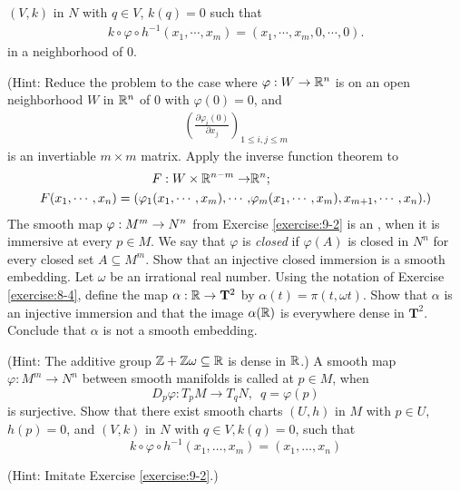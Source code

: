 \begin{enumerate}[label=\theexercise.\arabic*.,ref=\theexercise.\arabic*,leftmargin=2.7em]
    $(V, k)$ in $N$ with $q\in V$, $k(q)=0$ such that
    \begin{align*}
      k\circ\varphi\circ h^{-1}(x_1, \cdots, x_m) = (x_1, \cdots, x_m, 0, \cdots, 0).
    \end{align*}
    in a neighborhood of 0.\par
    \par(Hint: Reduce the problem to the case where $\varphi:W\to{\ensuremath{\mathbb{R}}}^n$ is on an open neighborhood $W$ in ${\mathbb{R}}^n$
    of 0 with $\varphi(0) = 0$, and
    \begin{align*}
      \left(\frac{\partial \varphi_i(0)}{\partial x_j}\right)_{1\le i,j\le m}
    \end{align*}
    is an invertiable $m\times m$ matrix. Apply the inverse function theorem to
    \begin{align*}
      F:W\times {\ensuremath{\mathbb{R}}}^{n-m}\to & {\mathbb{R}}^n;                       \\
      F(x_1, \cdots, x_n)
      = (
      \varphi_1(x_1, \cdots, x_m),
      \cdots,
                            & \varphi_m(x_1, \cdots, x_m),
      x_{m+1},
      \cdots,
      x_n
      ).)
    \end{align*}
  \NewItem The smooth map $\varphi: {M}^{m} \rightarrow  {N}^{n}$ from Exercise \ref{exercise:9-2} is an , when it is immersive at every $p \in  M$. We say that $\varphi$ is \textit{closed} if $\varphi ( A)$ is closed in ${N}^{n}$ for every closed set $A \subseteq  {M}^{m}$. Show that an injective closed immersion is a smooth embedding.
  \NewItem Let $\omega$ be an irrational real number. Using the notation of Exercise \ref{exercise:8-4}, define the map $\alpha  : \mathbb{R} \rightarrow  {\mathbf{T}}^{2}$ by $\alpha ( t)  = \pi ( {t,{\omega t}})$. Show that $\alpha$ is an injective immersion and that the image $\alpha ( \mathbb{R})$ is everywhere dense in ${\mathbf{T}}^{2}$. Conclude that $\alpha$ is not a smooth embedding.
    \par(Hint: The additive group $\mathbb{Z} + \mathbb{Z}\omega  \subseteq  \mathbb{R}$ is dense in $\mathbb{R}$.)
  \NewItem A smooth map $\varphi:M^m\to N^n$ between smooth manifolds is called 
    at $p\in M$, when
    \[
      D_p\varphi:T_pM\to T_qN, \enspace q = \varphi(p)
    \]
    is surjective. Show that there exist smooth charts $(U, h)$ in $M$ with $p\in U$,
    $h(p) = 0$, and $(V, k)$ in $N$ with $q\in V, k(q) = 0$, such that
    \[
      k\circ\varphi\circ h^{-1}(x_1, \ldots, x_m) = (x_1, \ldots, x_n)
    \]
    \par(Hint: Imitate Exercise \ref{exercise:9-2}.)

\end{enumerate}
